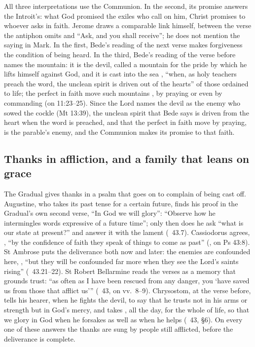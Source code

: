 All three interpretations use the Communion. In the second, its promise
answers the Introit's: what God promised the exiles who call on him, Christ
promises to whoever asks in faith. Jerome draws a comparable link himself, between the verse the antiphon
omits and ``Ask, and you shall receive''; he does not mention the saying in
Mark. In the first, Bede's reading of the next verse makes forgiveness the
condition of being heard. In the third, Bede's reading of the verse before
names the mountain: it is the devil, called a mountain for the pride by which
he lifts himself against God, and it is cast into the sea , ``when, as holy teachers preach the word, the unclean spirit is
driven out of the hearts'' of those ordained to life; the perfect in faith
move such mountains , by praying or even by
commanding (on 11:23--25). Since the Lord names the devil as the enemy who
sowed the cockle (Mt 13:39), the unclean spirit that Bede says is driven from
the heart when the word is preached, and that the perfect in faith move by
praying, is the parable's enemy, and the Communion makes its promise to that
faith.

\subsection{Thanks in affliction, and a family that leans on grace}

The Gradual gives thanks in a psalm that goes on to complain of being cast
off. Augustine, who takes its past tense for a certain future, finds his
proof in the Gradual's own second verse, ``In God we will glory'': ``Observe
how he intermingles words expressive of a future time''; only then does he ask
``what is our state at present?'' and answer it with the lament
(\ 43.7). Cassiodorus agrees, , ``by the confidence of faith they speak of
things to come as past'' (, on Ps 43:8). St Ambrose
puts the deliverance both now and later: the enemies are confounded here,
, ``but they will be confounded far more when they see the Lord's
saints rising'' (\ 43.21--22). St Robert Bellarmine reads
the verses as a memory that grounds trust: ``as often as I have been rescued
from any danger, you `have saved us from those that afflict us''' (\ 43, on vv.~8--9). Chrysostom, at the verse before, tells his hearer,
when he fights the devil, to say that he trusts not in his arms or strength
but in God's mercy, and takes , all the day, for the whole of
life, so that we glory in God when he forsakes as well as when he helps
(\ 43, §6). On every one of these answers the thanks are
sung by people still afflicted, before the deliverance is complete.

